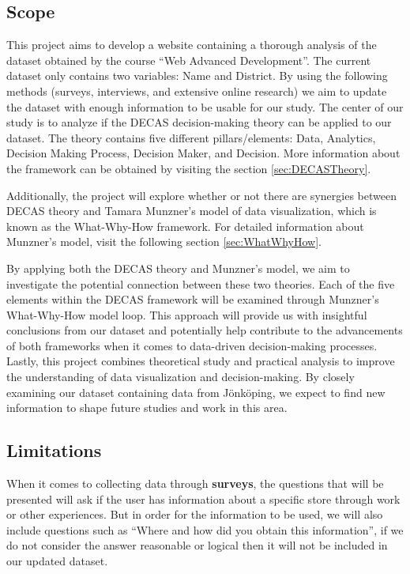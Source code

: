 \subsection{Scope}
This project aims to develop a website containing a thorough analysis of the dataset obtained by the course “Web Advanced Development”. The current dataset only contains two variables: Name and District. By using the following methods (surveys, interviews, and extensive online research) we aim to update the dataset with enough information to be usable for our study.
The center of our study is to analyze if the DECAS decision-making theory can be applied to our dataset. The theory contains five different pillars/elements: Data, Analytics, Decision Making Process, Decision Maker, and Decision. More information about the framework can be obtained by visiting the section \ref{sec:DECASTheory}.

Additionally, the project will explore whether or not there are synergies between DECAS theory and Tamara Munzner's model of data visualization, which is known as the What-Why-How framework. For detailed information about Munzner's model, visit the following section \ref{sec:WhatWhyHow}.

By applying both the DECAS theory and Munzner's model, we aim to investigate the potential connection between these two theories. Each of the five elements within the DECAS framework will be examined through Munzner's What-Why-How model loop. This approach will provide us with insightful conclusions from our dataset and potentially help contribute to the advancements of both frameworks when it comes to data-driven decision-making processes.
 Lastly, this project combines theoretical study and practical analysis to improve the understanding of data visualization and decision-making.  By closely examining our dataset containing data from Jönköping, we expect to find new information to shape future studies and work in this area.


\subsection{Limitations}


When it comes to collecting data through \textbf{surveys}, the questions that will be presented will ask if the user has information about a specific store through work or other experiences. But in order for the information to be used, we will also include questions such as “Where and how did you obtain this information”, if we do not consider the answer reasonable or logical then it will not be included in our updated dataset. 


